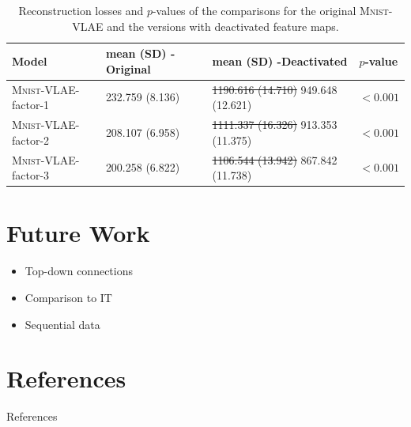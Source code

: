 \documentclass{beamer}
\begin{document}
\begin{frame}
\fontsize{6pt}{7.2}\selectfont
\begin{table}
\centering
\begin{tabularx}{\textwidth}{lXXX}
\toprule
Model                             & mean (SD) - Original & mean (SD) -\linebreak Deactivated & $p$-value \\
\midrule
\textsc{Mnist}-VLAE-factor-1 & 232.759 (8.136)      & \sout{1190.616 (14.710)} 949.648 (12.621)        & $< 0.001$ \\
\textsc{Mnist}-VLAE-factor-2 & 208.107 (6.958)      & \sout{1111.337 (16.326)} 913.353 (11.375)       & $< 0.001$ \\
\textsc{Mnist}-VLAE-factor-3 & 200.258 (6.822)      & \sout{1106.544 (13.942)} 867.842 (11.738)      & $< 0.001$ \\
\bottomrule
\end{tabularx}
\caption[\textsc{Mnist}-VLAEs: Reconstruction Losses]{Reconstruction losses and $p$-values of the comparisons for the original \textsc{Mnist}-VLAE and the versions with deactivated feature maps.}
\end{table}
\end{frame}
\section{Future Work}
\begin{frame}
\begin{itemize}
\item Top-down connections
\item Comparison to IT
\item Sequential data
\end{itemize}
\end{frame}
\section*{References}
\begin{frame}[allowframebreaks]{References}
\printbibliography
\end{frame}
\appendix
\end{document}
